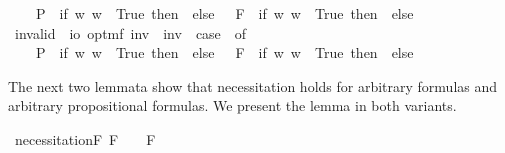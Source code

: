 \begin{isabellebody}
\ \ \ \ P{\isacharparenleft}{\isasympsi}{\isacharparenright}\ {\isasymRightarrow}\ if\ {\isasymexists}w{\isachardot}{\isasymnot}{\isacharparenleft}{\isasympsi}\ w{\isacharparenright}\ {\isasymlongleftrightarrow}\ True\ then\ {\isasymtop}\ else\ {\isasymbottom}\ {\isacharbar}\ F{\isacharparenleft}{\isasympsi}{\isacharparenright}\ {\isasymRightarrow}\ if\ {\isasymexists}w{\isachardot}{\isasymnot}{\isacharparenleft}{\isasympsi}\ w{\isacharparenright}\ {\isasymlongleftrightarrow}\ True\ then\ {\isasymtop}\ else\ {\isasymbottom}\ {\isacharbar}\ {\isacharunderscore}\ {\isasymRightarrow}\ {\isacharasterisk}{\isachardoublequoteclose}\isanewline
{}\isamarkupfalse%
\ invalid\ {\isacharcolon}{\isacharcolon}\ {\isachardoublequoteopen}io\ opt{\isasymRightarrow}mf{\isachardoublequoteclose}\ {\isacharparenleft}{\isachardoublequoteopen}{\isacharbrackleft}{\isacharunderscore}{\isacharbrackright}\isactrlsup i\isactrlsup n\isactrlsup v{\isachardoublequoteclose}{\isacharparenright}\ \ {\isachardoublequoteopen}{\isacharbrackleft}{\isasymphi}{\isacharbrackright}\isactrlsup i\isactrlsup n\isactrlsup v\ {\isasymequiv}\ case\ {\isasymphi}\ of\ \isanewline
\ \ \ \ P{\isacharparenleft}{\isasympsi}{\isacharparenright}\ {\isasymRightarrow}\ if\ {\isasymforall}w{\isachardot}{\isasymnot}{\isacharparenleft}{\isasympsi}\ w{\isacharparenright}\ {\isasymlongleftrightarrow}\ True\ then\ {\isasymtop}\ else\ {\isasymbottom}\ {\isacharbar}\ F{\isacharparenleft}{\isasympsi}{\isacharparenright}\ {\isasymRightarrow}\ if\ {\isasymforall}w{\isachardot}{\isasymnot}{\isacharparenleft}{\isasympsi}\ w{\isacharparenright}\ {\isasymlongleftrightarrow}\ True\ then\ {\isasymtop}\ else\ {\isasymbottom}\ {\isacharbar}\ {\isacharunderscore}\ {\isasymRightarrow}\ {\isacharasterisk}{\isachardoublequoteclose}%
\isamarkuptrue%
%
\isamarkuptrue%
%
\begin{isamarkuptext}%
The next two lemmata show that necessitation holds for arbitrary formulas 
 and arbitrary propositional formulas. We present the lemma in both variants.%
\end{isamarkuptext}%
\isamarkuptrue%
\isamarkupfalse%
\ necessitationF{\isacharcolon}\ {\isachardoublequoteopen}{\isacharbrackleft}{\isasymphi}\isactrlsup F{\isacharbrackright}\ {\isacharequal}\ {\isasymtop}\ {\isasymlongrightarrow}\ {\isacharbrackleft}\isactrlbold {\isasymbox}{\isacharparenleft}{\isasymphi}\isactrlsup F{\isacharparenright}{\isacharbrackright}\ {\isacharequal}\ {\isasymtop}{\isachardoublequoteclose}%

\end{isabellebody}
